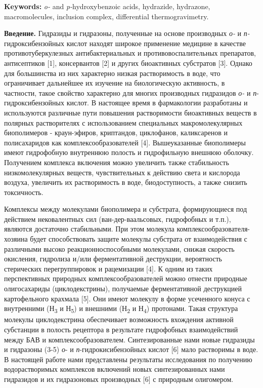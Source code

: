 {\bfseries Keywords:} \emph{o-} and \emph{p-}hydroxybenzoic acids,
hydrazide, hydrazone, macromolecules, inclusion complex, differential
thermogravimetry.

\begin{multicols}{2}
{\bfseries Введение.} Гидразиды и гидразоны, полученные на основе
производных \emph{о-} и \emph{п-}гидроксибензойных кислот находят
широкое применение медицине в качестве противотуберкулезных
антибактериальных и противовоспалительных препаратов, антисептиков
{[}1{]}, консервантов {[}2{]} и других биоактивных субстратов {[}3{]}.
Однако для большинства из них характерно низкая растворимость в воде,
что ограничивает дальнейшее их изучение на биологическую активность, в
частности, такое свойство характерно для многих производных гидразидов
\emph{о-} и \emph{п}-гидроксибензойных кислот. В настоящее время в
фармакологии разработаны и используются различные пути повышения
растворимости биоактивных веществ в полярных растворителях с
использованием специальных макромолекулярных биополимеров -
краун-эфиров, криптандов, циклофанов, каликсаренов и полисахаридов как
комплексообразователей {[}4{]}. Вышеуказанные биополимеры имеют
гидрофобную внутреннюю полость и гидрофильную внешнюю оболочку.
Получением комплекса включения можно увеличить также стабильность
низкомолекулярных веществ, чувствительных к действию света и кислорода
воздуха, увеличить их растворимость в воде, биодоступность, а также
снизить токсичность.

Комплексы между молекулами биополимера и субстрата, формирующиеся под
действием нековалентных сил (ван-дер-ваальсовых, гидрофобных и т.п.),
являются достаточно стабильными. При этом молекула
комплексообразователя-хозяина будет способствовать защите молекулы
субстрата от взаимодействия с различными высоко реакционноспособными
молекулами, снижая скорость окисления, гидролиза и/или ферментативной
деструкции, вероятность стерических перегруппировок и рацемизации
{[}4{]}. К одним из таких перспективных природных комплексообразователей
можно отнести природные олигосахариды (циклодекстрины), получаемые
ферментативной деструкцией картофельного крахмала {[}5{]}. Они имеют
молекулу в форме усеченного конуса с внутренними (Н\textsubscript{3} и
Н\textsubscript{5}) и внешними (Н\textsubscript{2} и Н\textsubscript{4})
протонами. Такая структура молекулы циклодекстрина обеспечивает
возможность вхождения активной субстанции в полость рецептора в
результате гидрофобных взаимодействий между БАВ и
комплексообразователем. Синтезированные нами новые гидразиды и гидразоны
(3-5) \emph{о}- и \emph{п}-гидрокисибензойных кислот {[}6{]} мало
растворимы в воде. В настоящей работе нами представлены результаты
исследования по получению водорастворимых комплексов включений новых
синтезированных нами гидразидов и их гидразоновых производных {[}6{]} с
природным олигомером.


\end{multicols}
